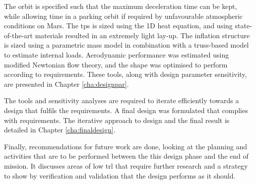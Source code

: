 The orbit is specified such that the maximum deceleration time can be kept, while allowing time in a parking orbit if required by unfavourable atmospheric conditions on Mars. The \gls{tps} is sized using the 1D heat equation, and using state-of-the-art materials resulted in an extremely light lay-up. The inflation structure is sized using a parametric mass model in combination with a truss-based model to estimate internal loads. Aerodynamic performance was estimated using modified Newtonian flow theory, and the shape was optimised to perform according to requirements. These tools, along with design parameter sensitivity, are presented in Chapter \ref{cha:designpar}.

The tools and sensitivity analyses are required to iterate efficiently towards a design that fulfils the requirements. A final design was formulated that complies with requirements. The iterative approach to design and the final result is detailed in Chapter \ref{cha:finaldesign}.

Finally, recommendations for future work are done, looking at the planning and activities that are to be performed between the this design phase and the end of mission. It discusses areas of low \gls{trl} that require further research and a strategy to show by verification and validation that the design performs as it should.




